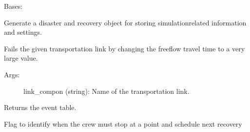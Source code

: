 \documentclass[letterpaper,10pt,english]{sphinxmanual}
\begin{document}
\begin{fulllineitems}
\label{\detokenize{apidoc:dreaminsg_integrated_model.src.network_recovery.NetworkRecovery}}
\sphinxAtStartPar
Bases: 

\sphinxAtStartPar
Generate a disaster and recovery object for storing simulation\sphinxhyphen{}related information and settings.

\begin{fulllineitems}
\label{\detokenize{apidoc:dreaminsg_integrated_model.src.network_recovery.NetworkRecovery.fail_transpo_link}}
\sphinxAtStartPar
Fails the given transportation link by changing the free\sphinxhyphen{}flow travel time to a very large value.
\begin{description}
\item[{Args:}] \leavevmode
\sphinxAtStartPar
link\_compon (string): Name of the transportation link.

\end{description}

\end{fulllineitems}


\begin{fulllineitems}
\label{\detokenize{apidoc:dreaminsg_integrated_model.src.network_recovery.NetworkRecovery.get_event_table}}
\sphinxAtStartPar
Returns the event table.

\end{fulllineitems}


\begin{fulllineitems}
\label{\detokenize{apidoc:dreaminsg_integrated_model.src.network_recovery.NetworkRecovery.initiate_next_recov_scheduled}}
\sphinxAtStartPar
Flag to identify when the crew must stop at a point and schedule next recovery


\end{fulllineitems}
\end{fulllineitems}
\end{document}
